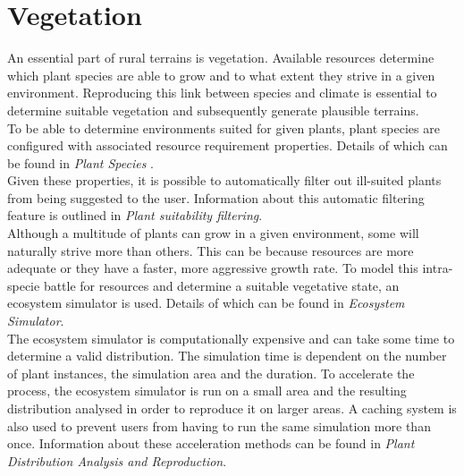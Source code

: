 \chapter{Vegetation}

An essential part of rural terrains is vegetation. Available resources determine which plant species are able to grow and to what extent they strive in a given environment. Reproducing this link between species and climate is essential to determine suitable vegetation and subsequently generate plausible terrains. \\

To be able to determine environments suited for given plants, plant species are configured with associated resource requirement properties. Details of which can be found in \textit{Plant Species} .\\
Given these properties, it is possible to automatically filter out ill-suited plants from being suggested to the user. Information about this automatic filtering feature is outlined in \textit{Plant suitability filtering}.\\

Although a multitude of plants can grow in a given environment, some will naturally strive more than others. This can be because resources are more adequate or they have a faster, more aggressive growth rate. To model this intra-specie battle for resources and  determine a suitable vegetative state, an ecosystem simulator is used. Details of which can be found in \textit{Ecosystem Simulator}.\\

The ecosystem simulator is computationally expensive and can take some time to determine a valid distribution. The simulation time is dependent on the number of plant instances, the simulation area and the duration. To accelerate the process, the ecosystem simulator is run on a small area and the resulting distribution analysed in order to reproduce it on larger areas. A caching system is also used to prevent users from having to run the same simulation more than once. Information about these acceleration methods can be found in \textit{Plant Distribution Analysis and Reproduction}.
